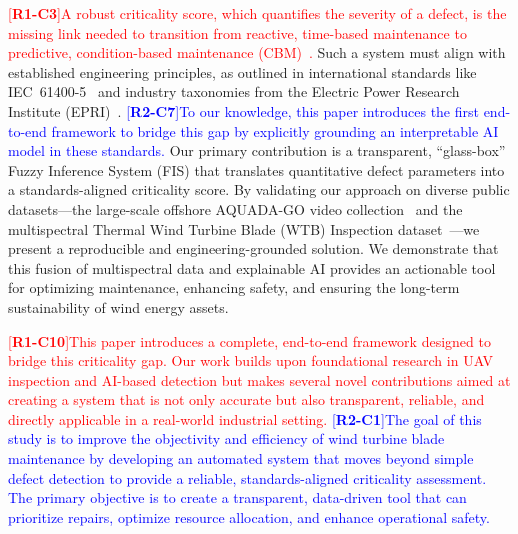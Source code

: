 \documentclass[energies,article,submit,pdftex,moreauthors]{Definitions/mdpi}
\newcommand{\revtag}[2]{[\textbf{R#1-C#2}]}
\newcommand{\Rone}[1]{\textcolor{red}{#1}}
\newcommand{\Rtwo}[1]{\textcolor{blue}{#1}}
\begin{document}
\Rone{\revtag{1}{3}A robust criticality score, which quantifies the severity of a defect, is the missing link needed to transition from reactive, time-based maintenance to predictive, condition-based maintenance (CBM)~\cite{Ogaili2023Methodological}.} Such a system must align with established engineering principles, as outlined in international standards like IEC~61400-5~\cite{iec61400-5} and industry taxonomies from the Electric Power Research Institute (EPRI)~\cite{epri2020whitepaper}. \Rtwo{\revtag{2}{7}To our knowledge, this paper introduces the first end-to-end framework to bridge this gap by explicitly grounding an interpretable AI model in these standards.} Our primary contribution is a transparent, ``glass-box'' Fuzzy Inference System (FIS) that translates quantitative defect parameters into a standards-aligned criticality score. By validating our approach on diverse public datasets—the large-scale offshore AQUADA-GO video collection~\cite{Chen2024Dataset} and the multispectral Thermal Wind Turbine Blade (WTB) Inspection dataset~\cite{Memari2024Data}—we present a reproducible and engineering-grounded solution. We demonstrate that this fusion of multispectral data and explainable AI provides an actionable tool for optimizing maintenance, enhancing safety, and ensuring the long-term sustainability of wind energy assets.

\Rone{\revtag{1}{10}This paper introduces a complete, end-to-end framework designed to bridge this criticality gap. Our work builds upon foundational research in UAV inspection and AI-based detection but makes several novel contributions aimed at creating a system that is not only accurate but also transparent, reliable, and directly applicable in a real-world industrial setting.} \Rtwo{\revtag{2}{1}The goal of this study is to improve the objectivity and efficiency of wind turbine blade maintenance by developing an automated system that moves beyond simple defect detection to provide a reliable, standards-aligned criticality assessment. The primary objective is to create a transparent, data-driven tool that can prioritize repairs, optimize resource allocation, and enhance operational safety.}
\end{document}
